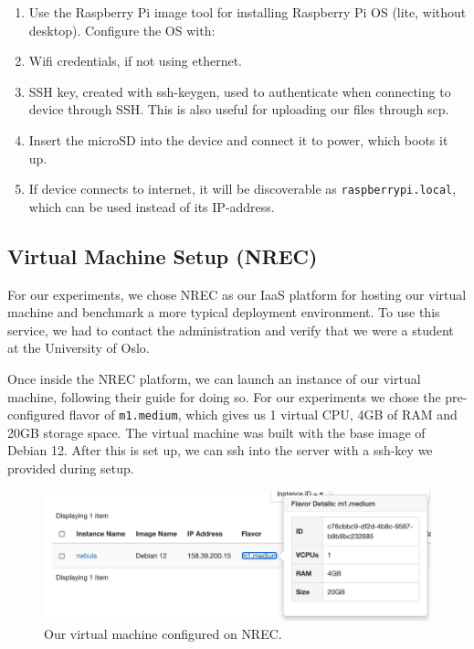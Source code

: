 \documentclass[
  table]{report}
\providecommand{\tightlist}{%
  \setlength{\itemsep}{0pt}\setlength{\parskip}{0pt}}
\begin{document}
\begin{enumerate}
\def\labelenumi{\arabic{enumi}.}
\tightlist
\item
  Use the Raspberry Pi image tool for installing Raspberry Pi OS (lite,
  without desktop). Configure the OS with:
\item
  Wifi credentials, if not using ethernet.
\item
  SSH key, created with ssh-keygen, used to authenticate when connecting
  to device through SSH. This is also useful for uploading our files
  through scp.
\item
  Insert the microSD into the device and connect it to power, which
  boots it up.
\item
  If device connects to internet, it will be discoverable as
  \texttt{raspberrypi.local}, which can be used instead of its
  IP-address.
\end{enumerate}

\subsection{Virtual Machine Setup (\ac{NREC})}

For our experiments, we chose \ac{NREC} as our \ac{IaaS} platform for
hosting our virtual machine and benchmark a more typical deployment
environment. To use this service, we had to contact the administration
and verify that we were a student at the University of Oslo.

Once inside the \ac{NREC} platform, we can launch an instance of our
virtual machine, following their guide for doing so.
For our experiments we chose the pre-configured flavor of
\texttt{m1.medium}, which gives us 1 virtual CPU, 4GB of RAM and 20GB
storage space. The virtual machine was built with the base image of
Debian 12. After this is set up, we can ssh into the server with a
ssh-key we provided during setup.

\begin{figure}[H]
\centering
  \includegraphics{assets/6-nrec_nebula}
  \caption{Our virtual machine configured on \ac{NREC}.}
  \label{fig:nrec_nebula}
\end{figure}
\end{document}
